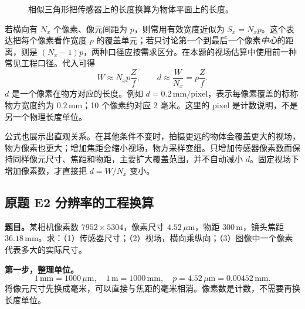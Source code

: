 \begin{figure}[htbp]
\centering
{}
\caption{相似三角形把传感器上的长度换算为物体平面上的长度。}
\label{fig:foundation-fov}
\end{figure}

若横向有 $N_x$ 个像素、像元间距为 $p$，则常用有效宽度近似为 $S_x=N_xp$。这个表达把每个像素看作宽度 $p$ 的覆盖单元；若只讨论第一个到最后一个像素\emph{中心}的距离，则是 $(N_x-1)p$，两种口径应按需求区分。在本题的视场估算中使用前一种常见工程口径。代入可得
\[
 W\approx N_xp\frac{Z}{f},\qquad
 d\approx\frac{W}{N_x}=p\frac{Z}{f}.
\]
$d$ 是一个像素在物方对应的长度。例如 $d=0.2\,\mathrm{mm/pixel}$，表示每像素覆盖的标称物方宽度约为 $0.2\,\mathrm{mm}$；10 个像素约对应 2 毫米。这里的 pixel 是计数说明，不是另一个物理长度单位。

公式也展示出直观关系。在其他条件不变时，拍摄更远的物体会覆盖更大的视场，物方像素也更大；增加焦距会缩小视场，物方采样变细。只增加传感器像素数而保持同样像元尺寸、焦距和物距，主要扩大覆盖范围，并不自动减小 $d$。固定视场下增加像素数，才直接把 $d=W/N_x$ 变小。

\subsection*{原题 E2 分辨率的工程换算}
\label{original:E2}
\textbf{题目。}某相机像素数 $7952\times5304$，像素尺寸 $4.52\,\mu\mathrm{m}$，物距 $300\,\mathrm{m}$，镜头焦距 $36.18\,\mathrm{mm}$。求：（1）传感器尺寸；（2）视场，横向乘纵向；（3）图像中一个像素代表多大的实际尺寸。

\textbf{第一步，整理单位。}
\[
 1\,\mathrm{mm}=1000\,\mu\mathrm{m},\quad
 1\,\mathrm{m}=1000\,\mathrm{mm},\quad
 p=4.52\,\mu\mathrm{m}=0.00452\,\mathrm{mm}.
\]
将像元尺寸先换成毫米，可以直接与焦距的毫米相消。像素数是计数，不需要再换长度单位。

